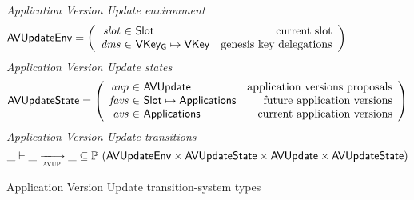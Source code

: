 \begin{figure}[htb]
  \emph{Application Version Update environment}
  \begin{equation*}
    \AVUpdateEnv =
    \left(
      \begin{array}{r@{~\in~}lr}
        \var{slot} & \Slot & \text{current slot}\\
        \var{dms} & \VKeyGen\mapsto\VKey & \text{genesis key delegations} \\
      \end{array}
    \right)
  \end{equation*}
  \emph{Application Version Update states}
  \begin{equation*}
    \AVUpdateState =
    \left(
      \begin{array}{r@{~\in~}lr}
        \var{aup} & \AVUpdate & \text{application versions proposals} \\
        \var{favs} & \Slot\mapsto\Applications & \text{future application versions} \\
        \var{avs} & \Applications & \text{current application versions} \\
      \end{array}
    \right)
  \end{equation*}
  \emph{Application Version Update transitions}
  \begin{equation*}
    \_ \vdash
    \var{\_} \trans{avup}{\_} \var{\_}
    \subseteq \powerset (\AVUpdateEnv \times \AVUpdateState \times \AVUpdate \times \AVUpdateState)
  \end{equation*}
  \caption{Application Version Update transition-system types}
  \label{fig:ts-types:av-update}
\end{figure}

